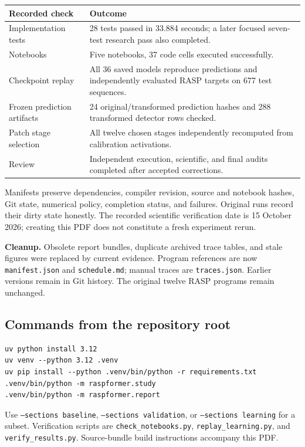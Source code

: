 \documentclass[10pt,a4paper]{article}
\begin{document}
\begin{center}\small
\begin{tabularx}{\linewidth}{@{}P{.28\linewidth}X@{}}
\toprule
Recorded check & Outcome\\
\midrule
Implementation tests & 28 tests passed in 33.884 seconds; a later focused seven-test research pass also completed.\\
Notebooks & Five notebooks, 37 code cells executed successfully.\\
Checkpoint replay & All 36 saved models reproduce predictions and independently evaluated RASP targets on 677 test sequences.\\
Frozen prediction artifacts & 24 original/transformed prediction hashes and 288 transformed detector rows checked.\\
Patch stage selection & All twelve chosen stages independently recomputed from calibration activations.\\
Review & Independent execution, scientific, and final audits completed after accepted corrections.\\
\bottomrule
\end{tabularx}
\end{center}

Manifests preserve dependencies, compiler revision, source and notebook hashes, Git state, numerical policy, completion status, and failures. Original runs record their dirty state honestly. The recorded scientific verification date is 15 October 2026; creating this PDF does not constitute a fresh experiment rerun.

\textbf{Cleanup.} Obsolete report bundles, duplicate archived trace tables, and stale figures were replaced by current evidence. Program references are now \texttt{manifest.json} and \texttt{schedule.md}; manual traces are \texttt{traces.json}. Earlier versions remain in Git history. The original twelve RASP programs remain unchanged.

\subsection*{Commands from the repository root}
\begingroup\small
\begin{verbatim}
uv python install 3.12
uv venv --python 3.12 .venv
uv pip install --python .venv/bin/python -r requirements.txt
.venv/bin/python -m raspformer.study
.venv/bin/python -m raspformer.report
\end{verbatim}
\endgroup
Use \texttt{--sections baseline}, \texttt{--sections validation}, or \texttt{--sections learning} for a subset. Verification scripts are \texttt{check\_notebooks.py}, \texttt{replay\_learning.py}, and \texttt{verify\_results.py}. Source-bundle build instructions accompany this PDF.
\end{document}
